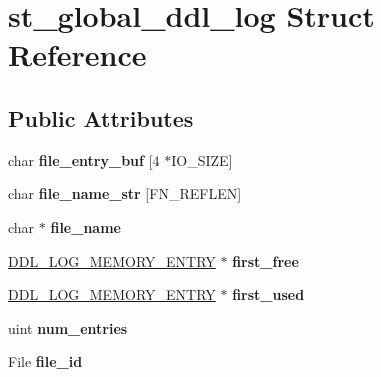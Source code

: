 \hypertarget{structst__global__ddl__log}{}\section{st\+\_\+global\+\_\+ddl\+\_\+log Struct Reference}
\label{structst__global__ddl__log}
\subsection*{Public Attributes}
\begin{DoxyCompactItemize}
\item 
\mbox{\label{structst__global__ddl__log_a8661bdf10bdbd660904523b04e7f8149}} 
char {\bfseries file\+\_\+entry\+\_\+buf} \mbox{[}4 $\ast$I\+O\+\_\+\+S\+I\+ZE\mbox{]}
\item 
\mbox{\label{structst__global__ddl__log_a2b0b6e650502f72a3926acb56fb1e67d}} 
char {\bfseries file\+\_\+name\+\_\+str} \mbox{[}F\+N\+\_\+\+R\+E\+F\+L\+EN\mbox{]}
\item 
\mbox{\label{structst__global__ddl__log_ac85495220eab638cba984b9d130ccbbf}} 
char $\ast$ {\bfseries file\+\_\+name}
\item 
\mbox{\label{structst__global__ddl__log_a6715b6bee1a29e1e53f70dec95d3640f}} 
\mbox{\hyperlink{structst__ddl__log__memory__entry}{D\+D\+L\+\_\+\+L\+O\+G\+\_\+\+M\+E\+M\+O\+R\+Y\+\_\+\+E\+N\+T\+RY}} $\ast$ {\bfseries first\+\_\+free}
\item 
\mbox{\label{structst__global__ddl__log_a18fb3e99eea1e1aebebf27e2cd8ef1bc}} 
\mbox{\hyperlink{structst__ddl__log__memory__entry}{D\+D\+L\+\_\+\+L\+O\+G\+\_\+\+M\+E\+M\+O\+R\+Y\+\_\+\+E\+N\+T\+RY}} $\ast$ {\bfseries first\+\_\+used}
\item 
\mbox{\label{structst__global__ddl__log_ac8db82b63826a7aa8b17fc5ad40b6c2d}} 
uint {\bfseries num\+\_\+entries}
\item 
\mbox{\label{structst__global__ddl__log_a3c0cfcc2d23d43bf2bce25015d08ba12}} 
File {\bfseries file\+\_\+id}

\end{DoxyCompactItemize}
